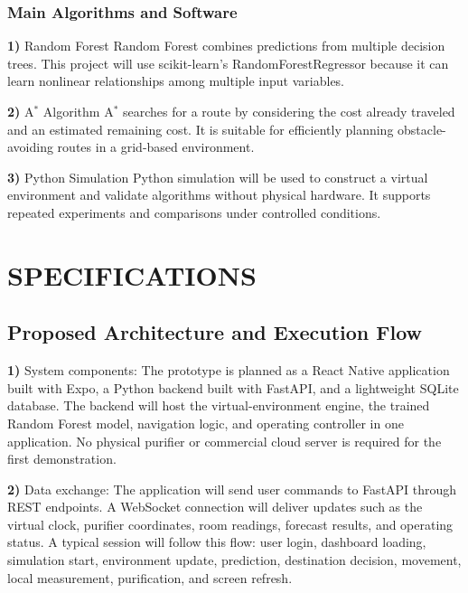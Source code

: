 \documentclass[conference]{IEEEtran}
\begin{document}
\subsubsection{Main Algorithms and Software}
\par\noindent\textbf{1)} Random Forest
Random Forest combines predictions from multiple decision trees. This project will use scikit-learn’s RandomForestRegressor because it can learn nonlinear relationships among multiple input variables.

\par\noindent\textbf{2)} A$^*$ Algorithm
A$^*$ searches for a route by considering the cost already traveled and an estimated remaining cost. It is suitable for efficiently planning obstacle-avoiding routes in a grid-based environment.

\par\noindent\textbf{3)} Python Simulation
Python simulation will be used to construct a virtual environment and validate algorithms without physical hardware. It supports repeated experiments and comparisons under controlled conditions.

\section{SPECIFICATIONS}
\subsection{Proposed Architecture and Execution Flow}
\par\noindent\textbf{1)} System components:
The prototype is planned as a React Native application built with Expo, a Python backend built with FastAPI, and a lightweight SQLite database. The backend will host the virtual-environment engine, the trained Random Forest model, navigation logic, and operating controller in one application. No physical purifier or commercial cloud server is required for the first demonstration.

\par\noindent\textbf{2)} Data exchange:
The application will send user commands to FastAPI through REST endpoints. A WebSocket connection will deliver updates such as the virtual clock, purifier coordinates, room readings, forecast results, and operating status. A typical session will follow this flow: user login, dashboard loading, simulation start, environment update, prediction, destination decision, movement, local measurement, purification, and screen refresh.
\end{document}
